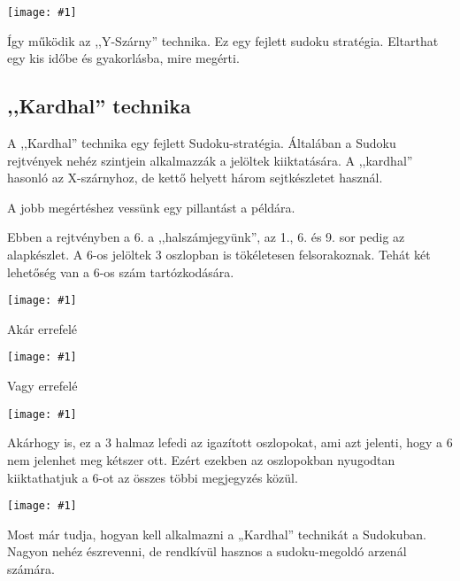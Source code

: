 \documentclass[a4paper,12pt,twoside]{article}
\newcommand{\kep}[1]{\texttt{[image: \#1]}}
\begin{document}
\kep{1646984432-14. Y-wing_2.png}

Így működik az ,,Y-Szárny'' technika. Ez egy fejlett sudoku stratégia. Eltarthat egy kis időbe és gyakorlásba, mire megérti.



\subsection{,,Kardhal'' technika}

A ,,Kardhal'' technika egy fejlett Sudoku-stratégia. Általában a Sudoku rejtvények nehéz szintjein alkalmazzák a jelöltek kiiktatására. A ,,kardhal'' hasonló az X-szárnyhoz, de kettő helyett három sejtkészletet használ.

A jobb megértéshez vessünk egy pillantást a példára.

Ebben a rejtvényben a 6. a ,,halszámjegyünk'', az 1., 6. és 9. sor pedig az alapkészlet. A 6-os jelöltek 3 oszlopban is tökéletesen felsorakoznak. Tehát két lehetőség van a 6-os szám tartózkodására.

\kep{1672735198-15. Swordfish_1.png}

Akár errefelé

\kep{1672735213-15. Swordfish_2.png}

Vagy errefelé

\kep{1672735217-15. Swordfish_3.png}

Akárhogy is, ez a 3 halmaz lefedi az igazított oszlopokat, ami azt jelenti, hogy a 6 nem jelenhet meg kétszer ott. Ezért ezekben az oszlopokban nyugodtan kiiktathatjuk a 6-ot az összes többi megjegyzés közül.

\kep{1673505183-15. Swordfish_4.png}

Most már tudja, hogyan kell alkalmazni a „Kardhal” technikát a Sudokuban. Nagyon nehéz észrevenni, de rendkívül hasznos a sudoku-megoldó arzenál számára.

\newpage

\vspace*{4cm}

\tableofcontents
\end{document}
